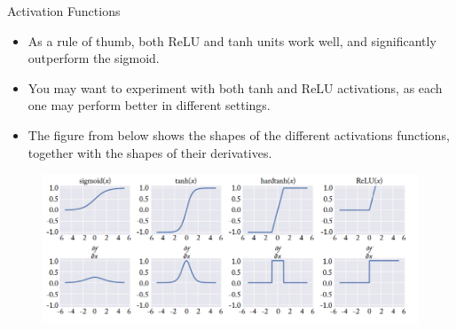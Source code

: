 \documentclass[handout]{beamer}
\begin{document}
\begin{frame}{Activation Functions}
\begin{scriptsize}
\begin{itemize}
\item As a rule of thumb, both ReLU and tanh units work well, and significantly outperform the sigmoid.
\item You may want to experiment with both tanh and ReLU activations, as each one may perform better in different settings.
\item The figure from below shows the shapes of the different activations functions, together with the shapes of their derivatives.
\end{itemize}
\begin{figure}[htb]
	\centering
	 \includegraphics[scale=0.35]{pics/activations.png}
\end{figure}

\end{scriptsize}
\end{frame}
\end{document}
